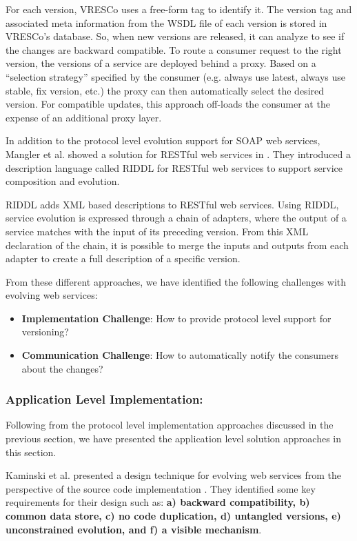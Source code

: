 \documentclass[runningheads,a4paper]{llncs}
\begin{document}
For each version, VRESCo uses a free-form tag to identify it. The version tag and associated meta information from the WSDL file of each version is stored in VRESCo's database. So, when new versions are released, it can analyze to see if the changes are backward compatible. To route a consumer request to the right version, the versions of a service are deployed behind a proxy. Based on a ``selection strategy'' specified by the consumer (e.g. always use latest, always use stable, fix version, etc.) the proxy can then automatically select the desired version. For compatible updates, this approach off-loads the consumer at the expense of an additional proxy layer.

In addition to the protocol level evolution support for SOAP web services, Mangler et al. showed a solution for RESTful web services in \cite{mangler2010origin}. They introduced a description language called RIDDL for RESTful web services to support service composition and evolution.

RIDDL adds XML based descriptions to RESTful web services. Using RIDDL, service evolution is expressed through a chain of adapters, where the output of a service matches with the input of its preceding version. From this XML declaration of the chain, it is possible to merge the inputs and outputs from each adapter to create a full description of a specific version.

From these different approaches, we have identified the following challenges with evolving web services:
\begin{itemize}
  \item \textbf{Implementation Challenge}: How to provide protocol level support for versioning?
  \item \textbf{Communication Challenge}: How to automatically notify the consumers about the changes?

\end{itemize}



\subsubsection{Application Level Implementation:}

Following from the protocol level implementation approaches discussed in the previous section, we have presented the application level solution approaches in this section.

Kaminski et al. presented a design technique for evolving web services from the perspective of the source code implementation \cite{kaminski2006design}. They identified some key requirements for their design such as: \textbf{a) backward compatibility, b) common data store, c) no code duplication, d) untangled versions, e) unconstrained evolution, and f) a visible mechanism}.
\end{document}

